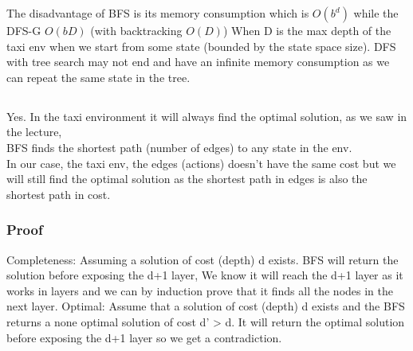 \documentclass[12pt]{article}
\begin{document}
The disadvantage of BFS is its memory consumption which is $O(b^d)$ while the DFS-G $O(bD)$ (with backtracking $O(D)$) When D is the max depth of the taxi env when we start from some state (bounded by the state space size). DFS with tree search may not end and have an infinite memory consumption as we can repeat the same state in the tree.

\subsection{}
Yes. In the taxi environment it will always find the optimal solution, as we saw in the lecture,\\

BFS finds the shortest path (number of edges) to any state in the env.\\
In our case, the taxi env, the edges (actions) doesn't have the same cost but we will still find the optimal solution as the shortest path in edges is also the shortest path in cost.
\subsubsection*{Proof}
Completeness: Assuming a solution of cost (depth) d exists. BFS will return the solution before exposing the d+1 layer, We know it will reach the d+1 layer as it works in layers and we can by induction prove that it finds all the nodes in the next layer.
Optimal: Assume that a solution of cost (depth) d exists and the BFS returns a none optimal solution of cost d’ > d. It will return the optimal solution before exposing the d+1 layer so we get a contradiction.
\end{document}
